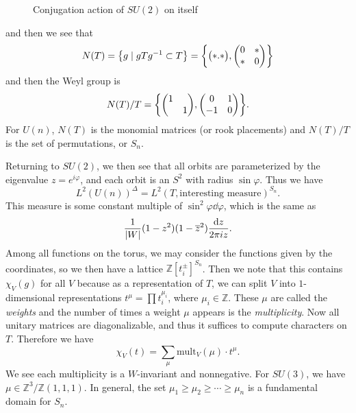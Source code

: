 \documentclass[leqno, openany]{memoir}
\theoremstyle{definition}
\theoremstyle{remark}
\theoremstyle{plain}
\theoremstyle{definition}
\theoremstyle{remark}
\newcommand{\Z}{\mathbb{Z}}
\newcommand{\ol}[1]{\overline{#1}}
\begin{document}
\begin{figure}[H]
    \caption{Conjugation action of $SU(2)$ on itself}%
    \label{fig:su2conj}
\end{figure}
and then we see that
\[ N(T) = \qty{g \mid gTg^{-1} \subset T} = \qty{ \mqty( \dmat{*.*} ), \mqty( 0 & * \\ * & 0 ) } \]
and then the Weyl group is 
\[ N(T) / T = \qty{ \mqty( \dmat{1,1} ), \mqty(0 & 1 \\ -1 & 0) }. \]
For $U(n)$, $N(T)$ is the monomial matrices (or rook placements) and $N(T)/T$ is the set of permutations, or $S_n$.

Returning to $SU(2)$, we then see that all orbits are parameterized by the eigenvalue $z = e^{i \varphi}$, and each orbit is an $S^2$ with radius $\sin \varphi$. Thus we have
\[ L^2(U(n))^{\Delta} = L^2(T, \text{interesting measure})^{S_n}. \]
This measure is some constant multiple of $\sin^2 \varphi \dd{\varphi}$, which is the same as
\[ \frac{1}{\abs{W}} (1-z^2)(1- \ol{z}^2) \frac{\dd{z}}{2 \pi i z}. \]
Among all functions on the torus, we may consider the functions given by the coordinates, so we then have a lattice $\Z[t_i^{\pm}]^{S_n}$. Then we note that this contains $\chi_V(g)$ for all $V$ because as a representation of $T$, we can split $V$ into $1$-dimensional representations $t^{\mu} = \prod t_i^{\mu_i}$, where $\mu_i \in \Z$. These $\mu$ are called the \textit{weights} and the number of times a weight $\mu$ appears is the \textit{multiplicity}. Now all unitary matrices are diagonalizable, and thus it suffices to compute characters on $T$. Therefore we have
\[ \chi_V(t) = \sum_{\mu} \text{mult}_V(\mu) \cdot t^{\mu}. \]
We see each multiplicity is a $W$-invariant and nonnegative. For $SU(3)$, we have $\mu \in \Z^3 / \Z(1,1,1)$. In general, the set $\mu_1 \geq \mu_2 \geq \cdots \geq \mu_n$ is a fundamental domain for $S_n$.
\end{document}
